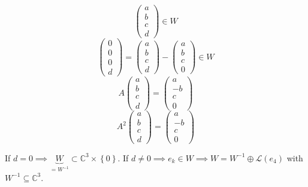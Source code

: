 \documentclass[a4paper]{article}
\theoremstyle{definition}
\newcommand\set[1]{\left\{#1\right\}}
\begin{document}
\[ \begin{pmatrix} a \\ b \\ c \\ d \end{pmatrix} \in W \]
\[
  \begin{pmatrix} 0 \\ 0 \\ 0 \\ d \end{pmatrix}
  = \begin{pmatrix} a \\ b \\ c \\ d \end{pmatrix} - \begin{pmatrix} a \\ b \\ c \\ 0 \end{pmatrix} \in W
\]
\[ A \begin{pmatrix} a \\ b \\ c \\ d \end{pmatrix} = \begin{pmatrix} a \\ -b \\ c \\ 0 \end{pmatrix} \]
\[ A^2 \begin{pmatrix} a \\ b \\ c \\ d \end{pmatrix} = \begin{pmatrix} a \\ -b \\ c \\ 0 \end{pmatrix} \]

If $d = 0 \implies \underbrace{W}_{= W^{-1}} \subset \mathbb C^3 \times \set{0}$.
If $d \neq 0 \implies e_k \in W \implies W = W^{-1} \oplus \mathcal L(e_4)$ with $W^{-1} \subseteq \mathbb C^3$.
\end{document}
